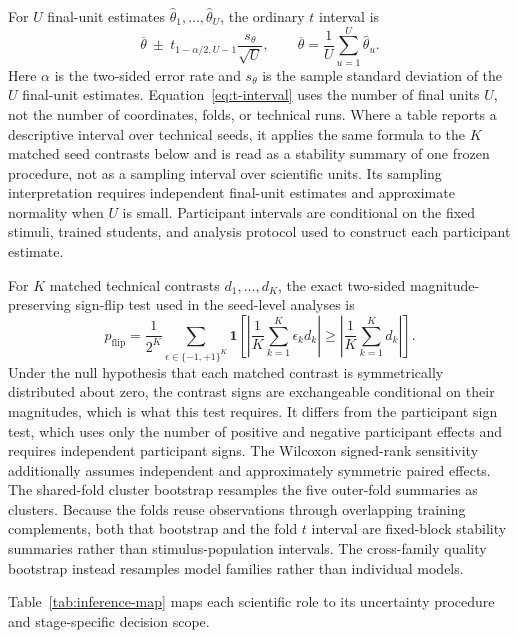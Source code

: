 For \(U\) final-unit estimates \(\widehat\theta_1,\ldots,\widehat\theta_U\), the ordinary \(t\) interval is
\begin{equation}
  \overline{\theta}
  \ \pm\
  t_{1-\alpha/2,U-1}
  \frac{s_\theta}{\sqrt U},
  \qquad
  \overline{\theta}=\frac{1}{U}\sum_{u=1}^{U}\widehat\theta_u.
  \label{eq:t-interval}
\end{equation}
Here \(\alpha\) is the two-sided error rate and \(s_\theta\) is the sample standard deviation of the \(U\) final-unit estimates.
Equation~\ref{eq:t-interval} uses the number of final units \(U\), not the number of coordinates, folds, or technical runs.
Where a table reports a descriptive interval over technical seeds, it applies the same formula to the \(K\) matched seed contrasts below and is read as a stability summary of one frozen procedure, not as a sampling interval over scientific units.
Its sampling interpretation requires independent final-unit estimates and approximate normality when \(U\) is small.
Participant intervals are conditional on the fixed stimuli, trained students, and analysis protocol used to construct each participant estimate.

For \(K\) matched technical contrasts \(d_1,\ldots,d_K\), the exact two-sided magnitude-preserving sign-flip test used in the seed-level analyses is
\begin{equation}
  p_{\mathrm{flip}}
  =
  \frac{1}{2^K}
  \sum_{\epsilon\in\{-1,+1\}^K}
  \mathbf 1\!\left[
    \left|\frac{1}{K}\sum_{k=1}^{K}\epsilon_kd_k\right|
    \ge
    \left|\frac{1}{K}\sum_{k=1}^{K}d_k\right|
  \right].
  \label{eq:sign-flip}
\end{equation}
Under the null hypothesis that each matched contrast is symmetrically distributed about zero, the contrast signs are exchangeable conditional on their magnitudes, which is what this test requires.
It differs from the participant sign test, which uses only the number of positive and negative participant effects and requires independent participant signs.
The Wilcoxon signed-rank sensitivity additionally assumes independent and approximately symmetric paired effects.
The shared-fold cluster bootstrap resamples the five outer-fold summaries as clusters.
Because the folds reuse observations through overlapping training complements, both that bootstrap and the fold \(t\) interval are fixed-block stability summaries rather than stimulus-population intervals.
The cross-family quality bootstrap instead resamples model families rather than individual models.

Table~\ref{tab:inference-map} maps each scientific role to its uncertainty procedure and stage-specific decision scope.


